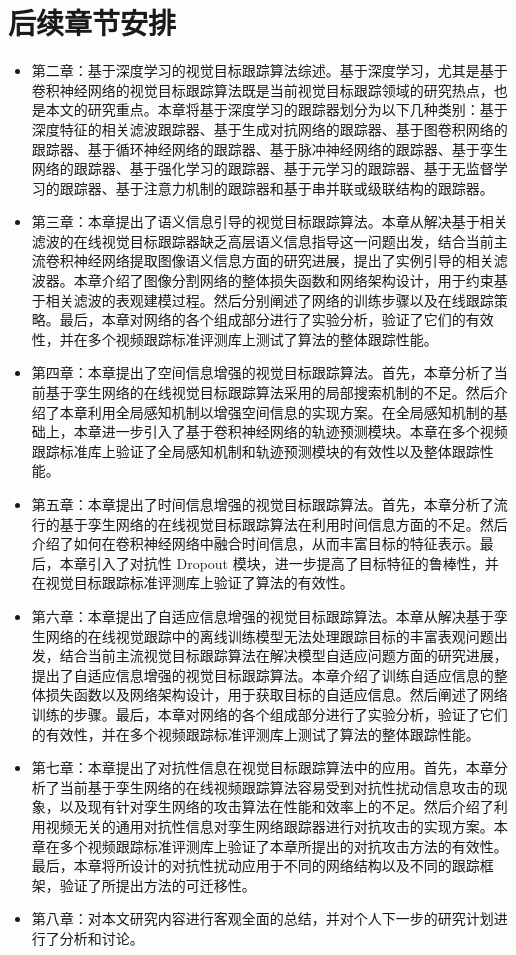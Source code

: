 \section{后续章节安排}
\begin{itemize}
\item 第二章：基于深度学习的视觉目标跟踪算法综述。基于深度学习，尤其是基于卷积神经网络的视觉目标跟踪算法既是当前视觉目标跟踪领域的研究热点，也是本文的研究重点。本章将基于深度学习的跟踪器划分为以下几种类别：基于深度特征的相关滤波跟踪器、基于生成对抗网络的跟踪器、基于图卷积网络的跟踪器、基于循环神经网络的跟踪器、基于脉冲神经网络的跟踪器、基于孪生网络的跟踪器、基于强化学习的跟踪器、基于元学习的跟踪器、基于无监督学习的跟踪器、基于注意力机制的跟踪器和基于串并联或级联结构的跟踪器。
\item 第三章：本章提出了语义信息引导的视觉目标跟踪算法。本章从解决基于相关滤波的在线视觉目标跟踪器缺乏高层语义信息指导这一问题出发，结合当前主流卷积神经网络提取图像语义信息方面的研究进展，提出了实例引导的相关滤波器。本章介绍了图像分割网络的整体损失函数和网络架构设计，用于约束基于相关滤波的表观建模过程。然后分别阐述了网络的训练步骤以及在线跟踪策略。最后，本章对网络的各个组成部分进行了实验分析，验证了它们的有效性，并在多个视频跟踪标准评测库上测试了算法的整体跟踪性能。
\item 第四章：本章提出了空间信息增强的视觉目标跟踪算法。首先，本章分析了当前基于孪生网络的在线视觉目标跟踪算法采用的局部搜索机制的不足。然后介绍了本章利用全局感知机制以增强空间信息的实现方案。在全局感知机制的基础上，本章进一步引入了基于卷积神经网络的轨迹预测模块。本章在多个视频跟踪标准库上验证了全局感知机制和轨迹预测模块的有效性以及整体跟踪性能。
\item 第五章：本章提出了时间信息增强的视觉目标跟踪算法。首先，本章分析了流行的基于孪生网络的在线视觉目标跟踪算法在利用时间信息方面的不足。然后介绍了如何在卷积神经网络中融合时间信息，从而丰富目标的特征表示。最后，本章引入了对抗性 Dropout 模块，进一步提高了目标特征的鲁棒性，并在视觉目标跟踪标准评测库上验证了算法的有效性。
\item 第六章：本章提出了自适应信息增强的视觉目标跟踪算法。本章从解决基于孪生网络的在线视觉跟踪中的离线训练模型无法处理跟踪目标的丰富表观问题出发，结合当前主流视觉目标跟踪算法在解决模型自适应问题方面的研究进展，提出了自适应信息增强的视觉目标跟踪算法。本章介绍了训练自适应信息的整体损失函数以及网络架构设计，用于获取目标的自适应信息。然后阐述了网络训练的步骤。最后，本章对网络的各个组成部分进行了实验分析，验证了它们的有效性，并在多个视频跟踪标准评测库上测试了算法的整体跟踪性能。
\item 第七章：本章提出了对抗性信息在视觉目标跟踪算法中的应用。首先，本章分析了当前基于孪生网络的在线视频跟踪算法容易受到对抗性扰动信息攻击的现象，以及现有针对孪生网络的攻击算法在性能和效率上的不足。然后介绍了利用视频无关的通用对抗性信息对孪生网络跟踪器进行对抗攻击的实现方案。本章在多个视频跟踪标准评测库上验证了本章所提出的对抗攻击方法的有效性。最后，本章将所设计的对抗性扰动应用于不同的网络结构以及不同的跟踪框架，验证了所提出方法的可迁移性。
\item 第八章：对本文研究内容进行客观全面的总结，并对个人下一步的研究计划进行了分析和讨论。
\end{itemize}
